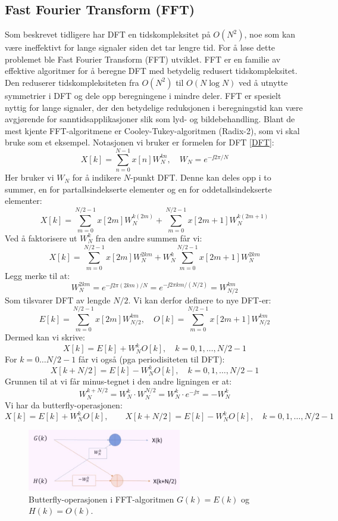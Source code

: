 \subsection{Fast Fourier Transform (FFT)}
Som beskrevet tidligere har DFT en tidskompleksitet på $O(N^2)$, noe som kan være ineffektivt for lange signaler siden det tar lengre tid. For å løse dette problemet ble Fast Fourier Transform (FFT) utviklet. FFT er en familie av effektive algoritmer for å beregne DFT med betydelig redusert tidskompleksitet. Den reduserer tidskompleksiteten fra $O(N^2)$ til $O(N \log N)$ ved å utnytte symmetrier i DFT og dele opp beregningene i mindre deler. FFT er spesielt nyttig for lange signaler, der den betydelige reduksjonen i beregningstid kan være avgjørende for sanntidsapplikasjoner slik som lyd- og bildebehandling. Blant de mest kjente FFT-algoritmene er Cooley-Tukey-algoritmen (Radix-2), som vi skal bruke som et eksempel. Notasjonen vi bruker er formelen for DFT \eqref{DFT}:
\[
    X[k] = \sum_{n=0}^{N-1} x[n] W_{N}^{kn}, \quad W_{N} = e^{-\jj 2 \pi / N}
\]
Her bruker vi $W_{N}$ for å indikere $N$-punkt DFT. Denne kan deles opp i to summer, en for partallsindekserte elementer og en for oddetallsindekserte elementer:
\[
    X[k] = \sum_{m=0}^{N/2-1} x[2m] W_{N}^{k(2m)} + \sum_{m=0}^{N/2-1} x[2m+1] W_{N}^{k(2m+1)}
\]
Ved å faktorisere ut $W_{N}^{k}$ fra den andre summen får vi: 
\[
    X[k] = \sum_{m=0}^{N/2-1} x[2m] W_{N}^{2km} + W_{N}^{k} \sum_{m=0}^{N/2-1} x[2m+1] W_{N}^{2km}
\]
Legg merke til at:
\[
    W_{N}^{2km} = e^{-\jj 2 \pi (2km) / N} = e^{-\jj 2 \pi km / (N/2)} = W_{N/2}^{km}
\]
Som tilsvarer DFT av lengde $N/2$. Vi kan derfor definere to nye DFT-er:
\[
    E[k] = \sum_{m=0}^{N/2-1} x[2m] W_{N/2}^{km}, \quad O[k] = \sum_{m=0}^{N/2-1} x[2m+1] W_{N/2}^{km}
\]
Dermed kan vi skrive:
\[
    X[k] = E[k] + W_{N}^{k} O[k], \quad k = 0, 1, \ldots, N/2 - 1
\]
For $k = 0 \ldots N/2 - 1$ får vi også (pga periodisiteten til DFT):
\[
    X[k + N/2] = E[k] - W_{N}^{k} O[k], \quad k = 0, 1, \ldots, N/2 - 1
\]
Grunnen til at vi får minus-tegnet i den andre ligningen er at:
\[
    W_N^{k + N/2} = W_N^k \cdot W_N^{N/2} = W_N^k \cdot e^{-\jj \pi} = -W_N^k
\]
Vi har da butterfly-operasjonen:
\[
    X[k] = E[k] + W_{N}^{k} O[k], \qquad X[k + N/2] = E[k] - W_{N}^{k} O[k], \quad k = 0, 1, \ldots, N/2 - 1
\]
\clearpage
\begin{figure}
    \centering
    \includegraphics[width=0.6\textwidth]{./Media/butterfly.png}
    \caption{Butterfly-operasjonen i FFT-algoritmen $G(k) = E(k)$ og $H(k)=O(k)$.}
    \label{fig:butterfly}
\end{figure}
